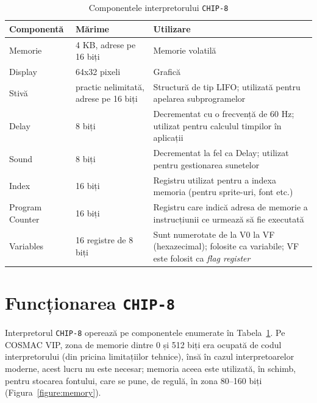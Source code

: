 \documentclass[a4paper]{article}
\begin{document}
\begin{table}
	\begin{center}
		\begin{tabular}{ |p{5em}|p{8em}|p{16em}| }
			\hline
			\textbf{Componentă} & \textbf{Mărime}                       & \textbf{Utilizare}                                                                                             \\
			\hline\hline
			Memorie             & 4 KB, adrese pe 16 biți               & Memorie volatilă                                                                                               \\
			\hline
			Display             & 64x32 pixeli                          & Grafică                                                                                                        \\
			\hline
			Stivă               & practic nelimitată, adrese pe 16 biți & Structură de tip LIFO; utilizată pentru apelarea subprogramelor                                                \\
			\hline
			Delay               & 8 biți                                & Decrementat cu o frecvență de 60 Hz; utilizat pentru calculul timpilor în aplicații                            \\
			\hline
			Sound               & 8 biți                                & Decrementat la fel ca Delay; utilizat pentru gestionarea sunetelor                                             \\
			\hline
			Index               & 16 biți                               & Registru utilizat pentru a indexa memoria (pentru sprite-uri, font etc.)                                       \\
			\hline
			Program Counter     & 16 biți                               & Registru care indică adresa de memorie a instrucțiunii ce urmează să fie executată                             \\
			\hline
			Variables           & 16 registre de 8 biți                 & Sunt numerotate de la V0 la VF (hexazecimal); folosite ca variabile; VF este folosit ca \textit{flag register} \\
			\hline
		\end{tabular}
		\caption{Componentele interpretorului \texttt{CHIP-8} \cite{langhoff}}
		\label{tab:componente}
	\end{center}
\end{table}

\section{Funcționarea \texttt{CHIP-8}}
Interpretorul \texttt{CHIP-8} operează pe componentele enumerate în Tabela~\ref{tab:componente}. Pe COSMAC VIP, zona de memorie
dintre 0 și 512 biți era ocupată de codul interpretorului (din pricina limitațiilor tehnice), însă în cazul interpretoarelor
moderne, acest lucru nu este necesar; memoria aceea este utilizată, în schimb, pentru stocarea fontului, care se pune,
de regulă, în zona 80--160 biți (Figura~\ref{figure:memory}).
\end{document}
